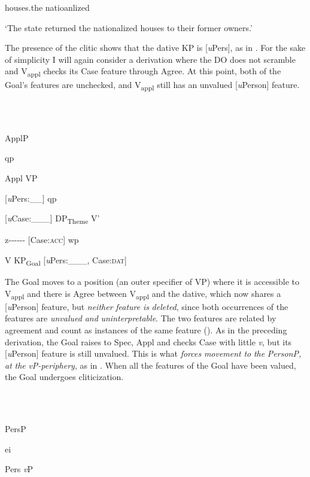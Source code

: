 \documentclass[output=paper,modfonts,nonflat]{langsci/langscibook}
\begin{document}
houses.the  natioanlized

  ‘The state returned the nationalized houses to their former owners.’

The presence of the clitic shows that the dative KP is [\textit{u}Pers], as in . For the sake of simplicity I will again consider a derivation where the DO does not scramble and V\textsubscript{appl} checks its Case feature through Agree. At this point, both of the Goal’s features are unchecked, and V\textsubscript{appl} still has an unvalued [\textit{u}Person] feature.

\ea%
    \label{ex:key:35}
    \gll\\
        \\
    \glt
    \z

              ApplP

qp

  Appl        VP

[\textit{u}Pers:\_\_]                        qp

[\textit{u}Case:\_\_\_]    DP\textsubscript{Theme}    V’

  z-{}-{}-{}-{}-{}- [Case:\textsc{acc}]    wp

V      KP\textsubscript{Goal} [\textit{u}Pers:\_\_\_, Case:\textsc{dat}]

The Goal moves to a position (an outer specifier of VP) where it is accessible to V\textsubscript{appl} and there is Agree between V\textsubscript{appl} and the dative, which now shares a [\textit{u}Person] feature, but \textit{neither} \textit{feature} \textit{is} \textit{deleted}, since both occurrences of the features are \textit{unvalued} \textit{and} \textit{uninterpretable}. The two features are related by agreement and count as instances of the same feature (\citealt{PesetskyTorrego2007}). As in the preceding derivation, the Goal raises to Spec, Appl and checks Case with little \textit{v}, but its [\textit{u}Person] feature is still unvalued. This is what \textit{forces} \textit{movement} \textit{to} \textit{the} \textit{PersonP,} \textit{at} \textit{the} \textit{vP-periphery}, as in . When all the features of the Goal have been valued, the Goal undergoes cliticization.

\ea%
    \label{ex:key:36}
    \gll\\
        \\
    \glt
    \z

          PersP

ei

Pers    \textit{v}P
\end{document}
